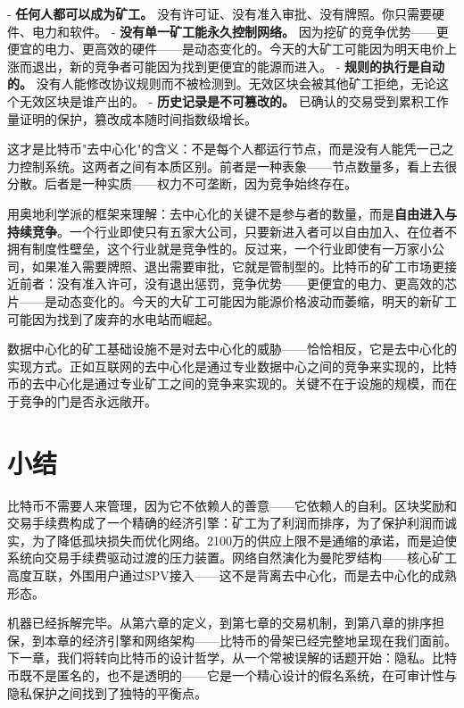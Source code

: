 \documentclass[a4paper,12pt,openany]{ctexbook}
\begin{document}
- \textbf{任何人都可以成为矿工。} 没有许可证、没有准入审批、没有牌照。你只需要硬件、电力和软件。
- \textbf{没有单一矿工能永久控制网络。} 因为挖矿的竞争优势——更便宜的电力、更高效的硬件——是动态变化的。今天的大矿工可能因为明天电价上涨而退出，新的竞争者可能因为找到更便宜的能源而进入。
- \textbf{规则的执行是自动的。} 没有人能修改协议规则而不被检测到。无效区块会被其他矿工拒绝，无论这个无效区块是谁产出的。
- \textbf{历史记录是不可篡改的。} 已确认的交易受到累积工作量证明的保护，篡改成本随时间指数级增长。

这才是比特币"去中心化"的含义：不是每个人都运行节点，而是没有人能凭一己之力控制系统。这两者之间有本质区别。前者是一种表象——节点数量多，看上去很分散。后者是一种实质——权力不可垄断，因为竞争始终存在。

用奥地利学派的框架来理解：去中心化的关键不是参与者的数量，而是\textbf{自由进入与持续竞争}。一个行业即使只有五家大公司，只要新进入者可以自由加入、在位者不拥有制度性壁垒，这个行业就是竞争性的。反过来，一个行业即使有一万家小公司，如果准入需要牌照、退出需要审批，它就是管制型的。比特币的矿工市场更接近前者：没有准入许可，没有退出惩罚，竞争优势——更便宜的电力、更高效的芯片——是动态变化的。今天的大矿工可能因为能源价格波动而萎缩，明天的新矿工可能因为找到了废弃的水电站而崛起。

数据中心化的矿工基础设施不是对去中心化的威胁——恰恰相反，它是去中心化的实现方式。正如互联网的去中心化是通过专业数据中心之间的竞争来实现的，比特币的去中心化是通过专业矿工之间的竞争来实现的。关键不在于设施的规模，而在于竞争的门是否永远敞开。


\section*{小结}


比特币不需要人来管理，因为它不依赖人的善意——它依赖人的自利。区块奖励和交易手续费构成了一个精确的经济引擎：矿工为了利润而排序，为了保护利润而诚实，为了降低孤块损失而优化网络。2100万的供应上限不是通缩的承诺，而是迫使系统向交易手续费驱动过渡的压力装置。网络自然演化为曼陀罗结构——核心矿工高度互联，外围用户通过SPV接入——这不是背离去中心化，而是去中心化的成熟形态。

机器已经拆解完毕。从第六章的定义，到第七章的交易机制，到第八章的排序担保，到本章的经济引擎和网络架构——比特币的骨架已经完整地呈现在我们面前。下一章，我们将转向比特币的设计哲学，从一个常被误解的话题开始：隐私。比特币既不是匿名的，也不是透明的——它是一个精心设计的假名系统，在可审计性与隐私保护之间找到了独特的平衡点。
\end{document}
